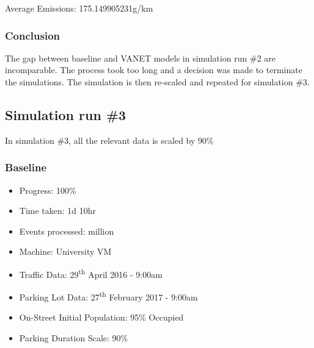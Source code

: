Average Emissions: 175.149905231g/km

\subsubsection{Conclusion}
The gap between baseline and \ac{VANET} models in simulation run \#2 are incomparable. The process took too long and a decision was made to terminate the simulations. The simulation is then re-scaled and repeated for simulation \#3.

\pagebreak

\subsection{Simulation run \#3}
In simulation \#3, all the relevant data is scaled by 90\%

\subsubsection{Baseline}
\begin{itemize}
    \setlength\itemsep{0em}
    \item Progress: 100\%
    \item Time taken: 1d 10hr
    \item Events processed:  million
    \item Machine: University VM
    \item Traffic Data: 29\textsuperscript{th} April 2016 - 9:00am
    \item Parking Lot Data: 27\textsuperscript{th} February 2017 - 9:00am
    \item On-Street Initial Population: 95\% Occupied
    \item Parking Duration Scale: 90\%
\end{itemize}

